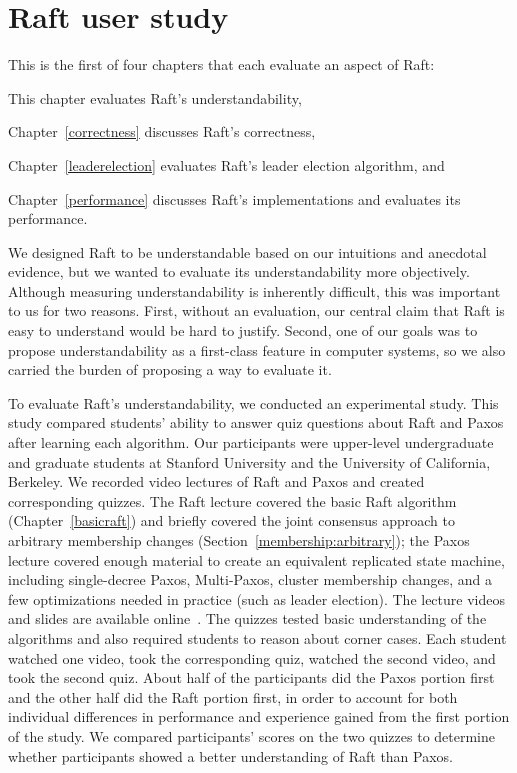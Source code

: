 \chapter{Raft user study}
\label{userstudy}

This is the first of four chapters that each evaluate an aspect of
Raft:
\begin{compactitem}
\item This chapter evaluates Raft's understandability,
\item Chapter~\ref{correctness} discusses Raft's correctness,
\item Chapter~\ref{leaderelection} evaluates Raft's leader election
algorithm, and
\item Chapter~\ref{performance} discusses Raft's implementations and
evaluates its performance.
\end{compactitem}




We designed Raft to be understandable based on our intuitions and
anecdotal evidence, but we wanted to evaluate its understandability more
objectively. Although measuring understandability is inherently
difficult, this was important to us for two reasons. First, without an
evaluation, our central claim that Raft is easy to understand would be
hard to justify. Second, one of our goals was to propose understandability
as a first-class feature in computer systems, so we also carried the
burden of proposing a way to evaluate it.

To evaluate Raft's understandability, we conducted an experimental
study. This study compared students' ability to answer quiz questions
about Raft and Paxos after learning each algorithm. Our participants
were upper-level undergraduate and graduate students at Stanford
University and the University of California, Berkeley. We recorded
video lectures of Raft and Paxos and created corresponding
quizzes.
The Raft lecture covered the basic Raft algorithm
(Chapter~\ref{basicraft}) and briefly covered the joint consensus
approach to arbitrary membership changes
(Section~\ref{membership:arbitrary});
the Paxos lecture covered enough material to create an
equivalent replicated state machine, including single-decree Paxos,
Multi-Paxos, cluster membership changes, and a few optimizations needed in
practice (such as leader election).
The lecture videos and slides are available online~\cite{study}.
The quizzes tested basic
understanding of the algorithms and also required students to reason
about corner cases. Each student watched one video, took the
corresponding quiz, watched the second video, and took the second quiz.
About half of the participants did the Paxos portion first and the other
half did the Raft portion first, in order to account for both individual
differences in performance and experience gained from the first portion
of the study. We compared participants' scores on the two quizzes to determine
whether participants showed a better understanding of Raft than Paxos.

